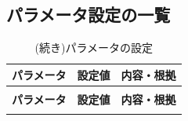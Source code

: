 
\subsection{パラメータ設定の一覧}
\label{sec:chapter4_parameters_list}

\begin{longtable}{@{}p{2.3cm}p{1.8cm}p{\dimexpr\textwidth-4.1cm-4\tabcolsep\relax}@{}}
  \caption{パラメータの設定} \label{tab:chapter4_parameters_list} \\
  \toprule
  \textbf{パラメータ} & \textbf{設定値} & \textbf{内容・根拠} \\
  \midrule
\endfirsthead

  \caption[]{(続き)パラメータの設定} \\
  \toprule
  \textbf{パラメータ} & \textbf{設定値} & \textbf{内容・根拠} \\
  \midrule
\endhead

  \bottomrule
\endlastfoot


\end{longtable}

